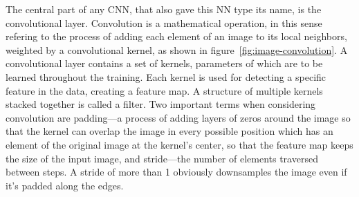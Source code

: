 The central part of any CNN, that also gave this NN type its name,
is the convolutional layer. Convolution is a mathematical operation, in this sense refering to
the process of adding each element of an image to its
local neighbors, weighted by a convolutional kernel, as shown in figure~\ref{fig:image-convolution}.
A convolutional layer contains a set of kernels, parameters of which are to be learned throughout the training.
Each kernel is used for detecting a specific feature in the data, creating a feature map.
A structure of multiple kernels stacked together is called a filter.
Two important terms when considering convolution are padding---a process
of adding layers of zeros around the image so that the kernel can overlap the image
in every possible position which has an element of the original image at the kernel's center,
so that the feature map keeps the size of the input image,
and stride---the number of elements traversed between steps.
A stride of more than 1 obviously downsamples the image even if it's padded along the edges.
\newpage

